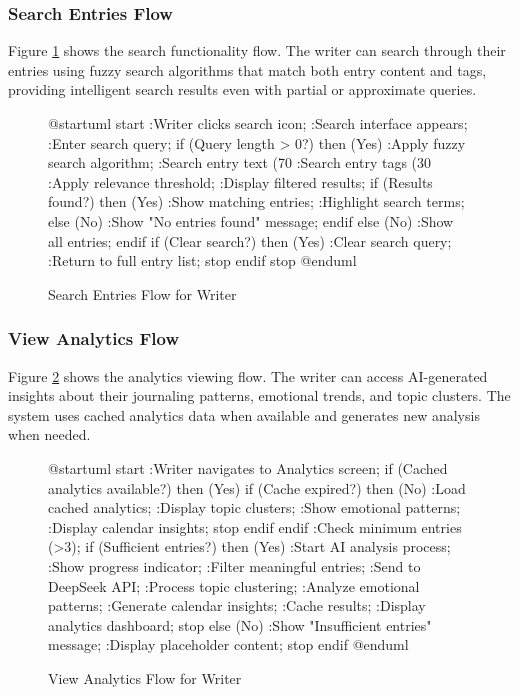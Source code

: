 \subsubsection{Search Entries Flow}\label{subsubsec:searchFlow}

Figure \ref{fig:search-flow} shows the search functionality flow. The writer can search through their entries using fuzzy search algorithms that match both entry content and tags, providing intelligent search results even with partial or approximate queries.

\begin{figure}[H]
\centering
\begin{plantuml}
@startuml
start
:Writer clicks search icon;
:Search interface appears;
:Enter search query;
if (Query length > 0?) then (Yes)
  :Apply fuzzy search algorithm;
  :Search entry text (70%
  :Search entry tags (30%
  :Apply relevance threshold;
  :Display filtered results;
  if (Results found?) then (Yes)
    :Show matching entries;
    :Highlight search terms;
  else (No)
    :Show "No entries found" message;
  endif
else (No)
  :Show all entries;
endif
if (Clear search?) then (Yes)
  :Clear search query;
  :Return to full entry list;
  stop
endif
stop
@enduml
\end{plantuml}
\caption{Search Entries Flow for Writer}
\label{fig:search-flow}
\end{figure}

\subsubsection{View Analytics Flow}\label{subsubsec:analyticsFlow}

Figure \ref{fig:analytics-flow} shows the analytics viewing flow. The writer can access AI-generated insights about their journaling patterns, emotional trends, and topic clusters. The system uses cached analytics data when available and generates new analysis when needed.

\begin{figure}[H]
\centering
\begin{plantuml}
@startuml
start
:Writer navigates to Analytics screen;
if (Cached analytics available?) then (Yes)
  if (Cache expired?) then (No)
    :Load cached analytics;
    :Display topic clusters;
    :Show emotional patterns;
    :Display calendar insights;
    stop
  endif
endif
:Check minimum entries (>3);
if (Sufficient entries?) then (Yes)
  :Start AI analysis process;
  :Show progress indicator;
  :Filter meaningful entries;
  :Send to DeepSeek API;
  :Process topic clustering;
  :Analyze emotional patterns;
  :Generate calendar insights;
  :Cache results;
  :Display analytics dashboard;
  stop
else (No)
  :Show "Insufficient entries" message;
  :Display placeholder content;
  stop
endif
@enduml
\end{plantuml}
\caption{View Analytics Flow for Writer}
\label{fig:analytics-flow}
\end{figure}

